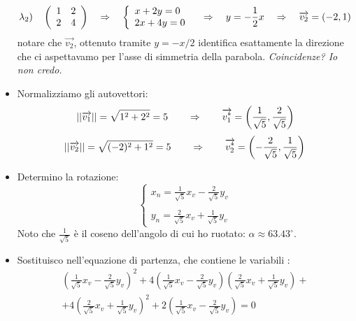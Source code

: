 \documentclass[a4paper, oneside]{article}
\begin{document}
\begin{itemize}
\begin{equation*}
					\lambda_2) \quad \left(
					\begin{array}{cc}
						1 & 2 \\
						2 & 4
					\end{array} \right) \quad \Rightarrow \quad \left\{
					\begin{array}{l}
						x+2y=0 \\
						2x +4y=0
					\end{array} \right. \quad \Rightarrow \quad y=-\frac{1}{2}x 
					\quad \Rightarrow \quad \overrightarrow{v_2}=(-2,1)
				\end{equation*}
				notare che $\overrightarrow{v_2}$, ottenuto tramite $y=-x/2$  identifica esattamente la direzione che ci aspettavamo per l'asse di simmetria della parabola. \emph{Coincidenze? Io non credo.}
				\item Normalizziamo gli autovettori:
				\begin{equation*}
					||\overrightarrow{v_1}||=\sqrt{1^2+2^2}=5 \qquad \Rightarrow \qquad \overrightarrow{v_1^{*}}=\left(\frac{1}{\sqrt{5}},\frac{2}{\sqrt{5}}\right)
				\end{equation*}
				\begin{equation*}
					||\overrightarrow{v_2}||=\sqrt{(-2)^2+1^2}=5 \qquad \Rightarrow \qquad \overrightarrow{v_2^{*}}=\left(-\frac{2}{\sqrt{5}},\frac{1}{\sqrt{5}}\right)
				\end{equation*}
				\item Determino la rotazione:
				\begin{equation*}
					\left\{
					\begin{array}{c}
						x_n = \displaystyle \frac{1}{\sqrt{5}} x_v - \frac{2}{\sqrt{5}} y_v \\ \\
						y_n = \displaystyle \frac{2}{\sqrt{5}} x_v + \frac{1}{\sqrt{5}} y_v
					\end{array} \right.
				\end{equation*}
				Noto che $\frac{1}{\sqrt{5}}$ è il coseno dell'angolo di cui ho ruotato: $\alpha\approx63.43^{\circ}$.
				\item Sostituisco nell'equazione di partenza, che contiene le variabili :
				\begin{align*}
					\left(\frac{1}{\sqrt{5}} x_v - \frac{2}{\sqrt{5}} y_v\right)^2 + 4\left(\frac{1}{\sqrt{5}} x_v - \frac{2}{\sqrt{5}} y_v\right)\left(\frac{2}{\sqrt{5}} x_v + \frac{1}{\sqrt{5}} y_v\right)+ \\ +4\left(\frac{2}{\sqrt{5}} x_v + \frac{1}{\sqrt{5}} y_v\right)^2+2\left(\frac{1}{\sqrt{5}} x_v - \frac{2}{\sqrt{5}} y_v\right)=0

\end{align*}
\end{itemize}
\end{document}

